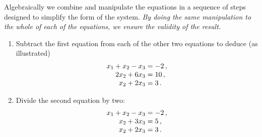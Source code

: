 \begin{example}
\begin{solution}
Algebraically we combine and manipulate the equations in a sequence of steps designed to simplify the form of the system.  
\emph{By doing the same manipulation to the whole of each of the equations, we ensure the validity of the result.}
\begin{enumerate}
\item Subtract the first equation from each of the other two equations to deduce (as illustrated)
\begin{equation*}
\begin{array}{r@{{}={}}l}
x_1+x_2-x_3&-2\,,\\
2x_2+6x_3&10\,,\\
x_2+2x_3&3\,.
\end{array}
\end{equation*}

\item Divide the second equation by two:
\begin{equation*}
\begin{array}{r@{{}={}}l}
x_1+x_2-x_3&-2\,,\\
x_2+3x_3&5\,,\\
x_2+2x_3&3\,.
\end{array}
\end{equation*}


\end{enumerate}
\end{solution}
\end{example}
